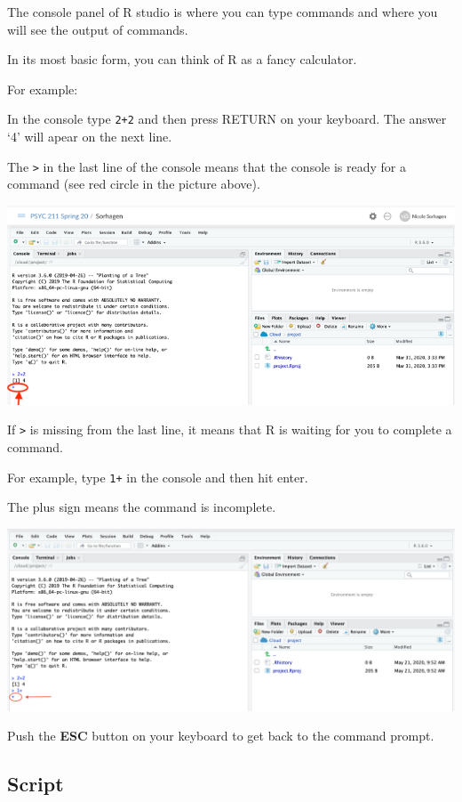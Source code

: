 \documentclass[
]{book}
\begin{document}
The console panel of R studio is where you can type commands and where you will see the output of commands.

In its most basic form, you can think of R as a fancy calculator.

For example:

In the console type \texttt{2+2} and then press RETURN on your keyboard. The answer `4' will apear on the next line.

The \texttt{\textgreater{}} in the last line of the console means that the console is ready for a command (see red circle in the picture above).

\includegraphics{img/twoplus.png}

If \texttt{\textgreater{}} is missing from the last line, it means that R is waiting for you to complete a command.

For example, type \texttt{1+} in the console and then hit enter.

The plus sign means the command is incomplete.

\includegraphics{img/waiting.png}

Push the \textbf{ESC} button on your keyboard to get back to the command prompt.

\hypertarget{script}{%
\subsection{Script}\label{script}}
\end{document}
